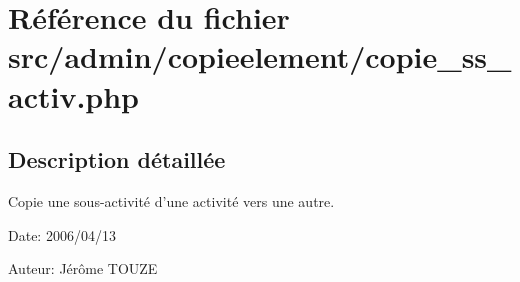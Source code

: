 \section{Référence du fichier src/admin/copieelement/copie\_\-ss\_\-activ.php}
\label{copie__ss__activ_8php}


\subsection{Description détaillée}
Copie une sous-activité d'une activité vers une autre. 

\begin{Desc}
\item[Date:]2006/04/13\end{Desc}
\begin{Desc}
\item[Auteur:]Jérôme TOUZE \end{Desc}


